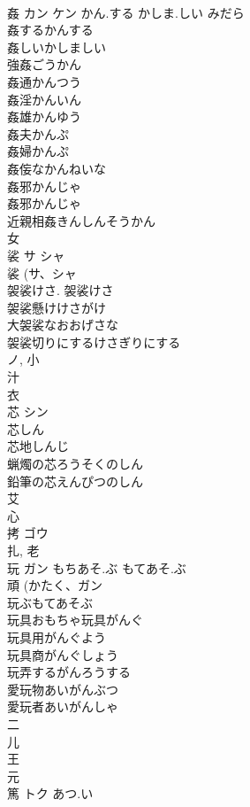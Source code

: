 \documentclass[8pt]{extreport}
\begin{document}
\begin{CJK}{UTF8}{min}
\\	姦	カン ケン	かん.する かしま.しい みだら	
\\	姦するかんする
\\	姦しいかしましい
\\	強姦ごうかん
\\	姦通かんつう
\\	姦淫かんいん
\\	姦雄かんゆう
\\	姦夫かんぷ
\\	姦婦かんぷ
\\	姦侫なかんねいな
\\	姦邪かんじゃ
\\	姦邪かんじゃ
\\	近親相姦きんしんそうかん
\\	女 
\\	裟	サ シャ		
\\	裟 (サ、シャ 
\\	袈裟けさ.		袈裟けさ
\\	袈裟懸けけさがけ
\\	大袈裟なおおげさな
\\	袈裟切りにするけさぎりにする
\\	ノ, 小 
\\	汁 
\\	衣 
\\	芯	シン		
\\	芯しん 
\\	芯地しんじ 
\\	蝋燭の芯ろうそくのしん 
\\	鉛筆の芯えんぴつのしん 
\\	艾 
\\	心 
\\	拷	ゴウ		
\\	扎, 老 
\\	玩	ガン	もちあそ.ぶ もてあそ.ぶ	
\\	頑 (かたく、ガン 
\\	玩ぶもてあそぶ
\\	玩具おもちゃ玩具がんぐ
\\	玩具用がんぐよう
\\	玩具商がんぐしょう
\\	玩弄するがんろうする
\\	愛玩物あいがんぶつ
\\	愛玩者あいがんしゃ
\\	二 
\\	儿 
\\	王 
\\	元 
\\	篤	トク	あつ.い	

\end{CJK}
\end{document}
